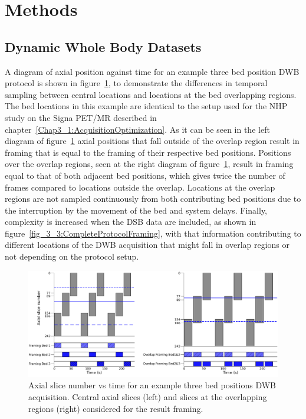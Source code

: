 \section{Methods}
\subsection{Dynamic Whole Body Datasets}
A diagram of axial position against time for an example three bed position DWB protocol is shown in figure~\ref{fig_3_3:OverlapFraming}, to demonstrate the differences in temporal sampling between central locations and locations at the bed overlapping regions. The bed locations in this example are identical to the setup used for the NHP study on the Signa PET/MR described in chapter~\ref{Chap3_1:AcquisitionOptimization}.
As it can be seen in the left diagram of figure~\ref{fig_3_3:OverlapFraming} axial positions that fall outside of the overlap region result in framing that is equal to the framing of their respective bed positions. Positions over the overlap regions, seen at the right diagram of figure~\ref{fig_3_3:OverlapFraming}, result in framing equal to that of both adjacent bed positions, which gives twice the number of frames compared to locations outside the overlap. Locations at the overlap regions are not sampled continuously from both contributing bed positions due to the interruption by the movement of the bed and system delays.  
Finally, complexity is increased when the DSB data are included, as shown in figure~\ref{fig_3_3:CompleteProtocolFraming}, with that information contributing to different locations of the DWB acquisition that might fall in overlap regions or not depending on the protocol setup. 

\begin{figure} [ht!]
\centering
\includegraphics[scale=0.50,angle=0]{3_Results/3_3_DWB_Reconstruction/figures/OverlapTiming.pdf}
\caption{Axial slice number vs time for an example three bed positions DWB acquisition. Central axial slices (left) and slices at the overlapping regions (right) considered for the result framing.} 
\label{fig_3_3:OverlapFraming}
\end{figure} 

